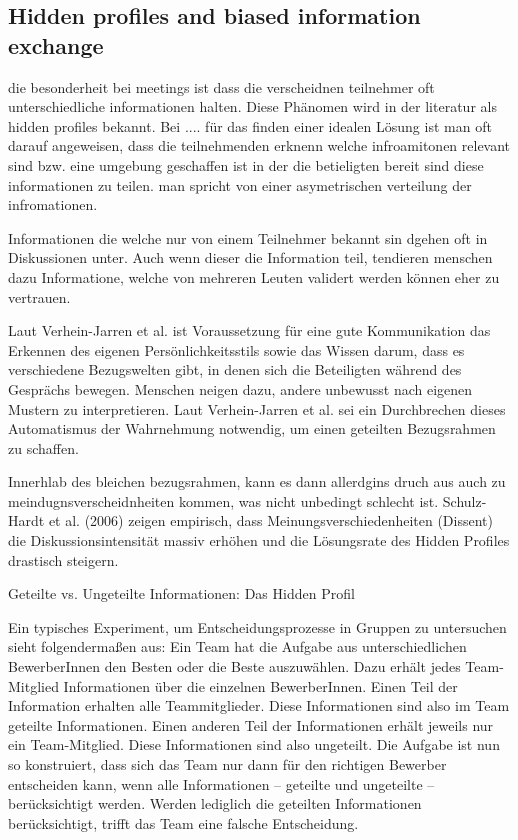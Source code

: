 \subsection{Hidden profiles and biased information exchange}
\label{sec:hidden-profiles}
die besonderheit bei meetings ist dass die verscheidnen teilnehmer oft unterschiedliche informationen halten.
Diese Phänomen wird in der literatur als hidden profiles bekannt. Bei ....
für das finden einer idealen Lösung ist man oft darauf angeweisen, dass die teilnehmenden erknenn welche
infroamitonen relevant sind bzw. eine umgebung geschaffen ist in der die betieligten bereit sind diese
informationen zu teilen. man spricht von einer asymetrischen verteilung der infromationen.

Informationen die welche nur von einem Teilnehmer bekannt sin dgehen oft in Diskussionen unter. Auch wenn
dieser die Information teil, tendieren menschen dazu Informatione, welche von mehreren Leuten validert werden
können eher zu vertrauen.

Laut Verhein-Jarren et al. ist Voraussetzung für eine gute Kommunikation das Erkennen des eigenen
Persönlichkeitsstils sowie das Wissen darum, dass es verschiedene Bezugswelten gibt, in denen sich die
Beteiligten während des Gesprächs bewegen. Menschen neigen dazu, andere unbewusst nach eigenen Mustern zu
interpretieren. Laut Verhein-Jarren et al. sei ein Durchbrechen dieses Automatismus der Wahrnehmung
notwendig, um einen geteilten Bezugsrahmen zu schaffen. \cite[p.
9]{verhein-jarrenGespraechsfuehrungTechnischenBerufen2018}

Innerhlab des bleichen bezugsrahmen, kann es dann allerdgins druch aus auch zu meindugnsverscheidnheiten
kommen, was nicht unbedingt schlecht ist. Schulz-Hardt et al. (2006) zeigen empirisch, dass
Meinungsverschiedenheiten (Dissent) die Diskussionsintensität massiv erhöhen und die Lösungsrate des Hidden
Profiles drastisch steigern. \cite{schulz-hardtGroupDecisionMaking2006}


Geteilte vs. Ungeteilte Informationen: Das Hidden Profil

Ein typisches Experiment, um Entscheidungsprozesse in Gruppen zu untersuchen sieht folgendermaßen aus: Ein
Team hat die Aufgabe aus unterschiedlichen BewerberInnen den Besten oder die Beste auszuwählen. Dazu erhält
jedes Team-Mitglied Informationen über die einzelnen BewerberInnen. Einen Teil der Information erhalten alle
Teammitglieder. Diese Informationen sind also im Team geteilte Informationen. Einen anderen Teil der
Informationen erhält jeweils nur ein Team-Mitglied. Diese Informationen sind also ungeteilt. Die Aufgabe ist
nun so konstruiert, dass sich das Team nur dann für den richtigen Bewerber entscheiden kann, wenn alle
Informationen – geteilte und ungeteilte – berücksichtigt werden. Werden lediglich die geteilten Informationen
berücksichtigt, trifft das Team eine falsche Entscheidung.

